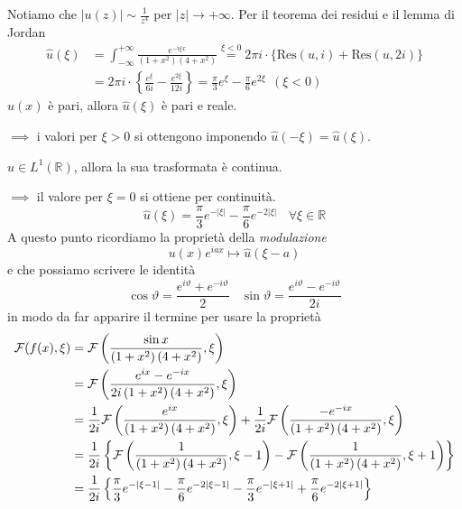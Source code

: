 Notiamo che $| u( z)| \sim \frac{1}{z^{4}}$ per $| z| \rightarrow +\infty $. Per il teorema dei residui e il lemma di Jordan
\begin{equation*}
\begin{aligned}
\hat{u}( \xi ) & =\int ^{+\infty }_{-\infty }\frac{e^{-i\xi x}}{\left( 1+x^{2}\right)\left( 4+x^{2}\right)}\overset{\xi < 0}{=} 2\pi i\cdotp \{\mathrm{Res}( u,i) +\mathrm{Res}( u,2i)\}\\
 & =2\pi i\cdotp \left\{\frac{e^{\xi }}{6i} -\frac{e^{2\xi }}{12i}\right\} =\frac{\pi }{3} e^{\xi } -\frac{\pi }{6} e^{2\xi } \ \ ( \xi < 0)
\end{aligned}
\end{equation*}
$u( x)$ è pari, allora $\hat{u}( \xi )$ è pari e reale.

$\implies $ i valori per $\xi  >0$ si ottengono imponendo $\hat{u}( -\xi ) =\hat{u}( \xi )$.

$u\in L^{1}(\mathbb{R})$, allora la sua trasformata è continua.

$\implies $ il valore per $\xi =0$ si ottiene per continuità.
\begin{equation*}
\hat{u}( \xi ) =\frac{\pi }{3} e^{-| \xi | } -\frac{\pi }{6} e^{-2| \xi | } \ \ \ \ \forall \xi \in \mathbb{R}
\end{equation*}
A questo punto ricordiamo la proprietà della \textit{modulazione}
\begin{equation*}
u( x) e^{iax} \mapsto \hat{u}( \xi -a)
\end{equation*}
e che possiamo scrivere le identità
\begin{equation*}
\cos \vartheta =\frac{e^{i\vartheta } +e^{-i\vartheta }}{2} \ \ \ \ \sin \vartheta =\frac{e^{i\vartheta } -e^{-i\vartheta }}{2i}
\end{equation*}
in modo da far apparire il termine per usare la proprietà
\begin{equation*}
\begin{aligned}
\mathcal{F} ( f( x) ,\xi ) & =\mathcal{F} \left(\frac{\sin x}{\left( 1+x^{2}\right)\left( 4+x^{2}\right)} ,\xi \right)\\
 & =\mathcal{F} \left(\frac{e^{ix} -e^{-ix}}{2i\left( 1+x^{2}\right)\left( 4+x^{2}\right)} ,\xi \right)\\
 & =\frac{1}{2i}\mathcal{F} \left(\frac{e^{ix}}{\left( 1+x^{2}\right)\left( 4+x^{2}\right)} ,\xi \right) +\frac{1}{2i}\mathcal{F} \left(\frac{-e^{-ix}}{\left( 1+x^{2}\right)\left( 4+x^{2}\right)} ,\xi \right)\\
 & =\frac{1}{2i}\left\{\mathcal{F} \left(\frac{1}{\left( 1+x^{2}\right)\left( 4+x^{2}\right)} ,\xi -1\right) -\mathcal{F} \left(\frac{1}{\left( 1+x^{2}\right)\left( 4+x^{2}\right)} ,\xi +1\right)\right\}\\
 & =\frac{1}{2i}\left\{\frac{\pi }{3} e^{-| \xi -1| } -\frac{\pi }{6} e^{-2| \xi -1| } -\frac{\pi }{3} e^{-| \xi +1| } +\frac{\pi }{6} e^{-2| \xi +1| }\right\}
\end{aligned}
\end{equation*}
\Soluzione

